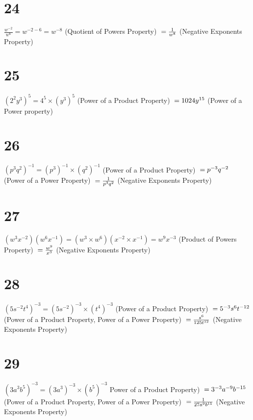 \documentclass{article}
\theoremstyle{definition}
\begin{document}
\section*{24}
$\frac{w^{-2}}{w^6}=w^{-2-6}=w^{-8}$ (Quotient of Powers Property)
$\newline =\frac{1}{w^8}$ (Negative Exponents Property)

\section*{25}
$(2^2y^3)^5=4^5\times (y^3)^5$ (Power of a Product Property)
$\newline =1024y^{15}$ (Power of a Power property)

\section*{26}
$(p^3q^2)^{-1}=(p^3)^{-1}\times (q^2)^{-1}$ (Power of a Product Property)
$\newline =p^{-3}q^{-2}$ (Power of a Power Property)
$\newline =\frac{1}{p^3q^2}$ (Negative Exponents Property)

\section*{27}
$(w^3x^{-2})(w^6x^{-1})=(w^3\times w^6)(x^{-2}\times x^{-1})=w^9x^{-3}$ (Product of Powers Property)
$\newline =\frac{w^9}{x^3}$ (Negative Exponents Property)

\section*{28}
$(5s^{-2}t^4)^{-3}=(5s^{-2})^{-3}\times (t^4)^{-3}$ (Power of a Product Property)
$\newline =5^{-3}s^6t^{-12}$ (Power of a Product Property, Power of a Power Property)
$\newline =\frac{s^6}{125t^{12}}$ (Negative Exponents Property)

\section*{29}
$(3a^3b^5)^{-3}=(3a^3)^{-3}\times (b^5)^{-3}$ Power of a Product Property)
$\newline =3^{-3}a^{-9}b^{-15}$ (Power of a Product Property, Power of a Power Property)
$\newline =\frac{1}{27a^9b^{15}}$ (Negative Exponents Property)
\end{document}
